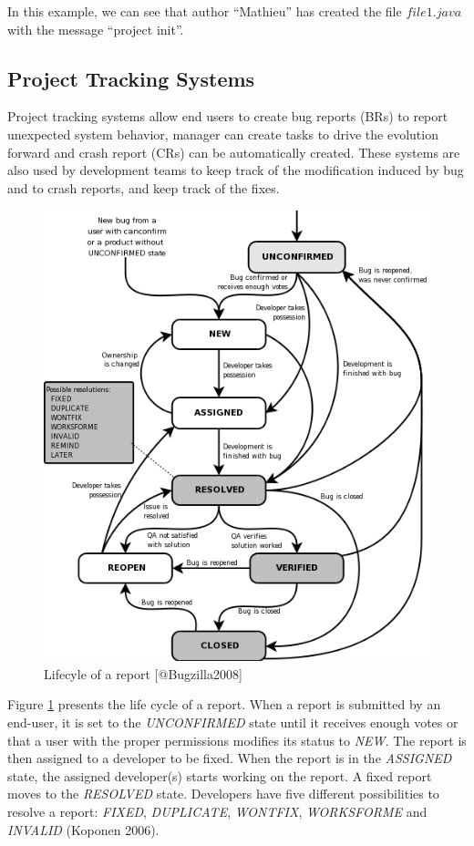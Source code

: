 \documentclass[natbib]{svjour3}
\begin{document}
In this example, we can see that author ``Mathieu'' has created the file
\(file1.java\) with the message ``project init''.

\subsection{Project Tracking Systems\label{sec:issue-tracking}}

Project tracking systems allow end users to create bug reports (BRs) to
report unexpected system behavior, manager can create tasks to drive the
evolution forward and crash report (CRs) can be automatically created.
These systems are also used by development teams to keep track of the
modification induced by bug and to crash reports, and keep track of the
fixes.

\begin{figure}[h!]
    \centering
    \includegraphics[scale=0.5]{media/bzLifecycle.png}
    \caption{Lifecyle of a report [@Bugzilla2008]}
    \label{fig:bug-lifecyle}
\end{figure}

Figure \ref{fig:bug-lifecyle} presents the life cycle of a report. When
a report is submitted by an end-user, it is set to the
\emph{UNCONFIRMED} state until it receives enough votes or that a user
with the proper permissions modifies its status to \emph{NEW}. The
report is then assigned to a developer to be fixed. When the report is
in the \emph{ASSIGNED} state, the assigned developer(s) starts working
on the report. A fixed report moves to the \emph{RESOLVED} state.
Developers have five different possibilities to resolve a report:
\emph{FIXED}, \emph{DUPLICATE}, \emph{WONTFIX}, \emph{WORKSFORME} and
\emph{INVALID} (Koponen 2006).
\end{document}

